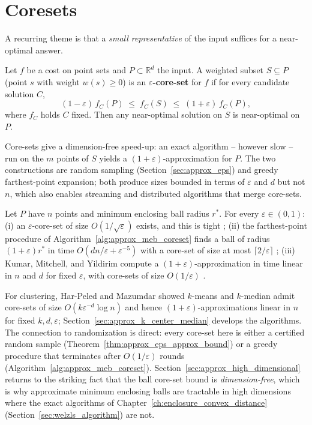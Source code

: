\section{Coresets}
\label{sec:approx_coresets}

A recurring theme is that a \emph{small representative} of the input
suffices for a near-optimal answer.

\begin{definition}\label{def:approx_coreset}
  Let $f$ be a cost on point sets and $P \subset \mathbb{R}^d$ the input. A
  weighted subset $S \subseteq P$ (point $s$ with weight $w(s) \geq 0$) is
  an \textbf{$\varepsilon$-core-set} for $f$ if for every
  candidate solution $C$,
  \[
    (1 - \varepsilon)\, f_C(P) \;\leq\; f_C(S) \;\leq\;
    (1 + \varepsilon)\, f_C(P),
  \]
  where $f_C$ holds $C$ fixed. Then any near-optimal solution on $S$ is
  near-optimal on $P$.
\end{definition}

Core-sets give a dimension-free speed-up: an exact algorithm -- however slow
-- run on the $m$ points of $S$ yields a $(1 + \varepsilon)$-approximation
for $P$. The two constructions are random sampling
(Section~\ref{sec:approx_eps}) and greedy farthest-point expansion; both
produce sizes bounded in terms of $\varepsilon$ and $d$ but not $n$, which
also enables streaming and distributed algorithms that merge core-sets.

\begin{theorem}\label{thm:approx_meb_coreset_bound}
  Let $P$ have $n$ points and minimum enclosing ball radius $r^*$. For every
  $\varepsilon \in (0,1)$: (i) an $\varepsilon$-core-set of size
  $O(1/\sqrt{\varepsilon})$ exists, and this is tight \cite{badoiu2002};
  (ii) the farthest-point procedure of
  Algorithm~\ref{alg:approx_meb_coreset} finds a ball of radius
  $(1 + \varepsilon) r^*$ in time $O(dn/\varepsilon + \varepsilon^{-5})$
  with a core-set of size at most $\lceil 2/\varepsilon \rceil$
  \cite{badoiu2002}; (iii) Kumar, Mitchell, and Yildirim compute a
  $(1 + \varepsilon)$-approximation in time linear in $n$ and $d$ for fixed
  $\varepsilon$, with core-sets of size $O(1/\varepsilon)$
  \cite{kumar2003}.
\end{theorem}

For clustering, Har-Peled and Mazumdar \cite{harpeled2004} showed $k$-means
and $k$-median admit core-sets of size $O(k \varepsilon^{-d} \log n)$ and
hence $(1 + \varepsilon)$-approximations linear in $n$ for fixed
$k, d, \varepsilon$; Section~\ref{sec:approx_k_center_median} develops the
algorithms. The connection to randomization is direct: every core-set here
is either a certified random sample (Theorem~\ref{thm:approx_eps_approx_bound})
or a greedy procedure that terminates after $O(1/\varepsilon)$ rounds
(Algorithm~\ref{alg:approx_meb_coreset}). Section~\ref{sec:approx_high_dimensional}
returns to the striking fact that the ball core-set bound is
\emph{dimension-free}, which is why approximate minimum enclosing balls are
tractable in high dimensions where the exact algorithms of
Chapter~\ref{ch:enclosure_convex_distance} (Section~\ref{sec:welzls_algorithm})
are not.

